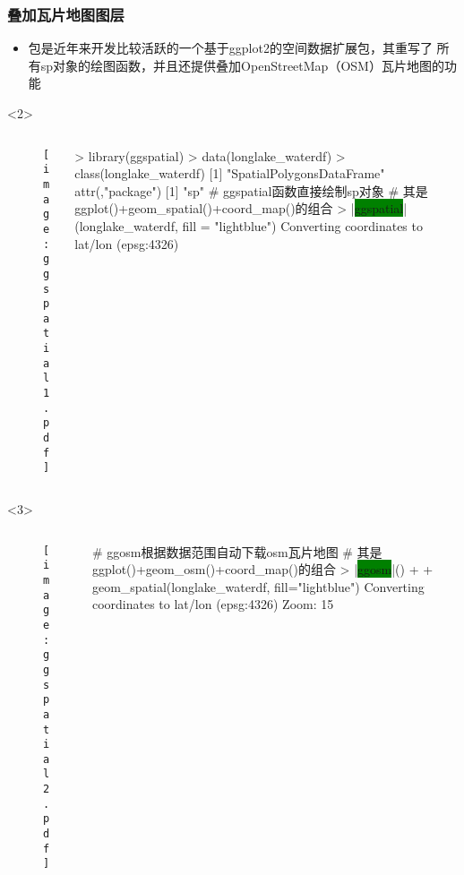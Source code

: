 \subsubsection{叠加瓦片地图图层}
\begin{frame}[t,fragile]{\subsecname}{\subsubsecname}
\begin{itemize} 
\item<1-> 包是近年来开发比较活跃的一个基于ggplot2的空间数据扩展包，其重写了
所有sp对象的绘图函数，并且还提供叠加OpenStreetMap（OSM）瓦片地图的功能
\end{itemize}

\begin{overlayarea}{\textwidth}{\textheight}
\begin{onlyenv}<2>
\begin{columns} 
\begin{column}{.4\textwidth}
\begin{figure}[ht] 
  \centering 
  \texttt{[image: ggspatial1.pdf]}
\end{figure}
\end{column}

\begin{column}{.6\textwidth}
\centering
\begin{rcode}
> library(ggspatial)
> data(longlake_waterdf)
> class(longlake_waterdf)
[1] "SpatialPolygonsDataFrame"
attr(,"package")
[1] "sp"
# ggspatial函数直接绘制sp对象
# 其是ggplot()+geom\_spatial()+coord\_map()的组合
> |\colorbox{green}{ggspatial}|(longlake_waterdf, fill = "lightblue")
Converting coordinates to lat/lon (epsg:4326)
\end{rcode}
\end{column}
\end{columns}
\end{onlyenv}

\begin{onlyenv}<3>
\begin{columns} 
\begin{column}{.4\textwidth}
\begin{figure}[ht] 
  \centering 
  \texttt{[image: ggspatial2.pdf]}
\end{figure}
\end{column}

\begin{column}{.6\textwidth}
\centering
\begin{rcode}
# ggosm根据数据范围自动下载osm瓦片地图
# 其是ggplot()+geom\_osm()+coord\_map()的组合
> |\colorbox{green}{ggosm}|() + 
+     geom_spatial(longlake_waterdf, fill="lightblue")
Converting coordinates to lat/lon (epsg:4326)
Zoom: 15
\end{rcode}
\end{column}
\end{columns}
\end{onlyenv}
\end{overlayarea}
\end{frame}

